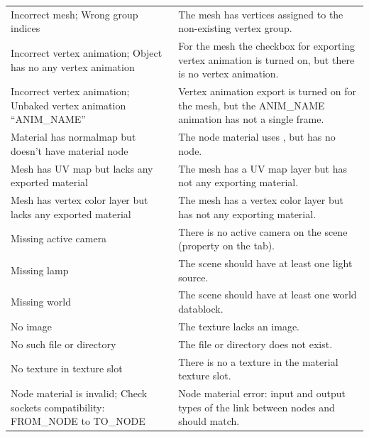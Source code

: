 \documentclass[a4paper,12pt,oneside]{sphinxmanual}
\begin{document}
\begin{tabulary}{\linewidth}{|L|L|}
\hline

Incorrect mesh; Wrong group indices
 & 
The mesh has vertices assigned to the non-existing vertex group.
\\

Incorrect vertex animation; Object
has no any vertex animation
 & 
For the mesh the checkbox for exporting vertex animation is turned on, but there is no vertex animation.
\\

Incorrect vertex animation; Unbaked
vertex animation ``ANIM\_NAME''
 & 
Vertex animation export is turned on for the mesh, but the ANIM\_NAME animation has not a single frame.
\\

Material has normalmap but doesn't
have material node
 & 
The node material uses , but has no  node.
\\

Mesh has UV map but lacks any
exported material
 & 
The mesh has a UV map layer but has not any exporting material.
\\

Mesh has vertex color layer but
lacks any exported material
 & 
The mesh has a vertex color layer but has not any exporting material.
\\

Missing active camera
 & 
There is no active camera on the scene (property  on the  tab).
\\

Missing lamp
 & 
The scene should have at least one light source.
\\

Missing world
 & 
The scene should have at least one world datablock.
\\

No image
 & 
The texture lacks an image.
\\

No such file or directory
 & 
The file or directory does not exist.
\\

No texture in texture slot
 & 
There is no a texture in the material texture slot.
\\

Node material is invalid; Check
sockets compatibility: FROM\_NODE to
TO\_NODE
 & 
Node material error: input and output types of the link between nodes  and  should match.
\\


\end{tabulary}
\end{document}
